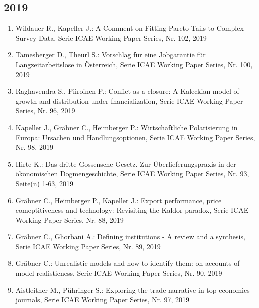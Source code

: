 \subsection*{2019}
\begin{enumerate}
    	 \item Wildauer R., Kapeller J.: A Comment on Fitting Pareto Tails to Complex Survey Data, Serie ICAE Working Paper Series, Nr. 102, 2019
	 \item Tamesberger D., Theurl S.: Vorschlag für eine Jobgarantie für Langzeitarbeitslose in Österreich, Serie ICAE Working Paper Series, Nr. 100, 2019
	 \item Raghavendra S., Piiroinen P.: Confict as a closure: A Kaleckian model of growth and distribution under fnancialization, Serie ICAE Working Paper Series, Nr. 96, 2019
	 \item Kapeller J., Gräbner C., Heimberger P.: Wirtschaftliche Polarisierung in Europa: Ursachen und Handlungsoptionen, Serie ICAE Working Paper Series, Nr. 98, 2019
	 \item Hirte K.: Das dritte Gossensche Gesetz. Zur Überlieferungspraxis in der ökonomischen Dogmengeschichte, Serie ICAE Working Paper Series, Nr. 93, Seite(n) 1-63, 2019
	 \item Gräbner C., Heimberger P., Kapeller J.: Export performance, price comeptitiveness and technology: Revisiting the Kaldor paradox, Serie ICAE Working Paper Series, Nr. 88, 2019
	 \item Gräbner C., Ghorbani A.: Defining institutions - A review and a synthesis, Serie ICAE Working Paper Series, Nr. 89, 2019
	 \item Gräbner C.: Unrealistic models and how to identify them: on accounts of model realisticness, Serie ICAE Working Paper Series, Nr. 90, 2019
	 \item Aistleitner M., Pühringer S.: Exploring the trade narrative in top economics journals, Serie ICAE Working Paper Series, Nr. 97, 2019
\end{enumerate}
